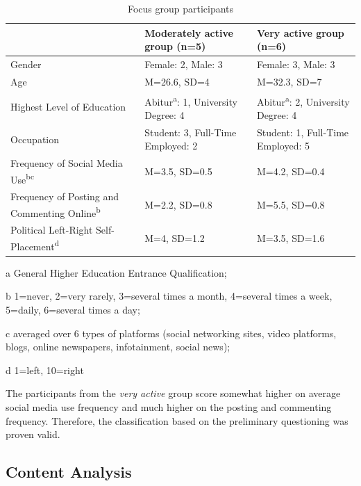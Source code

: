 \documentclass[runningheads]{llncs}
\begin{document}
\begin{table}

\caption{\label{tab:table-participants}Focus group participants}
\centering
\begin{threeparttable}
\begin{tabular}[t]{>{\raggedright\arraybackslash}p{10em}>{\raggedright\arraybackslash}p{10em}>{\raggedright\arraybackslash}p{10em}}
\toprule
  & Moderately active group (n=5) & Very active group (n=6)\\
\midrule
Gender & Female: 2, Male: 3 & Female: 3, Male: 3\\
Age & M=26.6, SD=4 & M=32.3, SD=7\\
Highest Level of Education & Abitur\textsuperscript{a}: 1, University Degree: 4 & Abitur\textsuperscript{a}: 2, University Degree: 4\\
Occupation & Student: 3, Full-Time Employed: 2 & Student: 1, Full-Time Employed: 5\\
Frequency of Social Media Use\textsuperscript{b}\textsuperscript{c} & M=3.5, SD=0.5 & M=4.2, SD=0.4\\
\addlinespace
Frequency of Posting and Commenting Online\textsuperscript{b} & M=2.2, SD=0.8 & M=5.5, SD=0.8\\
Political Left-Right Self-Placement\textsuperscript{d} & M=4, SD=1.2 & M=3.5, SD=1.6\\
\bottomrule
\end{tabular}
\begin{tablenotes}
\item[a] General Higher Education Entrance Qualification;
\item[b] 1=never, 2=very rarely, 3=several times a month, 4=several times a week, 5=daily, 6=several times a day;
\item[c] averaged over 6 types of platforms (social networking sites, video platforms, blogs, online newspapers, infotainment, social news);
\item[d] 1=left, 10=right
\end{tablenotes}
\end{threeparttable}
\end{table}

The participants from the \emph{very active} group score somewhat higher on average social media use frequency and much higher on the posting and commenting frequency. Therefore, the classification based on the preliminary questioning was proven valid.

\hypertarget{content-analysis}{%
\subsection{Content Analysis}\label{content-analysis}}
\end{document}
